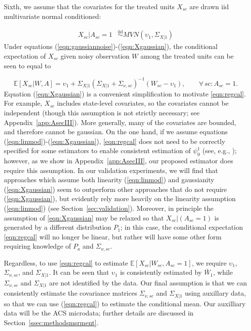 \documentclass[aoas]{imsart}
\theoremstyle{plain}
\theoremstyle{remark}
\begin{document}
Sixth, we assume that the covariates for the treated units $X_{sc}$ are drawn iid multivariate normal conditioned:

\begin{align} \label{eqn:Xgaussian}
    X_{sc}|A_{sc} = 1 & \stackrel{\text{iid}}{\sim} MVN(\upsilon_1, \Sigma_{X|1})%
\end{align}
%
Under equations (\ref{eqn:gaussiannoise})-(\ref{eqn:Xgaussian}), the conditional expectation of $X_{sc}$ given noisy observation $W$ among the treated units can be seen to equal to

\begin{equation} \label{eqn:regcal}
\mathbb{E}[X_{sc}| W, A] = \upsilon_1 + \Sigma_{X|1} \left(\Sigma_{X|1} + \Sigma_{\nu, sc}\right)^{-1}  (W_{sc} - \upsilon_1), \qquad \forall\, sc: A_{sc} = 1.
\end{equation}
%
Equation (\ref{eqn:Xgaussian}) is a convenient simplification to motivate \eqref{eqn:regcal}. For example, $X_{sc}$ includes state-level covariates, so the covariates cannot be independent (though this assumption is not strictly necessary; see Appendix~\ref{app:AsecIII}). More generally, many of the covariates are bounded, and therefore cannot be gaussian. On the one hand, if we assume equations (\ref{eqn:linmod})-(\ref{eqn:Xgaussian}), \eqref{eqn:regcal} does not need to be correctly specified for some estimators to enable consistent estimation of $\psi_0^1$ (see, e.g., \cite{gleser1992importance}); however, as we show in Appendix~\ref{app:AsecIII}, our proposed estimator does require this assumption. In our validation experiments, we will find that approaches which assume both linearity (\ref{eqn:linmod}) and gaussianity (\ref{eqn:Xgaussian}) seem to outperform other approaches that do not require (\ref{eqn:Xgaussian}), but evidently rely more heavily on the linearity assumption (\ref{eqn:linmod}) (see Section~\ref{sec:validation}). Moreover, in principle the assumption of \eqref{eqn:Xgaussian} may be relaxed so that $X_{sc}|(A_{sc}=1)$ is generated by a different distribution $P_1$; in this case, the conditional expectation \eqref{eqn:regcal} will no longer be linear, but rather will have some other form requiring knowledge of $P_a$ and $\Sigma_{\nu, sc}$.

Regardless, to use \eqref{eqn:regcal} to estimate $\mathbb{E}[X_{sc}|W_{sc}, A_{sc}=1]$, we require $\upsilon_1$, $\Sigma_{\nu,sc}$, and $\Sigma_{X|1}$. It can be seen that $\upsilon_1$ is consistently estimated by $\bar{W}_1$, while $\Sigma_{\nu,sc}$ and $\Sigma_{X|1}$ are not identified by the data. Our final assumption is that we can consistently estimate the covariance matrices $\Sigma_{\nu,sc}$ and $\Sigma_{X|1}$ using auxillary data, so that we can use (\ref{eqn:regcal}) to estimate the conditional mean. Our auxilliary data will be the ACS microdata; further details are discussed in Section~\ref{ssec:methodsmsrment}.
\end{document}
